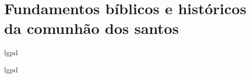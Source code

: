 \newpage
\section{Fundamentos bíblicos e históricos da comunhão dos santos}

\gls{lgpd}

\gls{lgpd}

\cite{cfw}